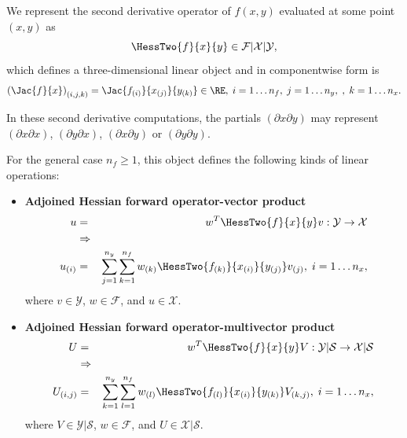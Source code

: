 \documentclass[pdf,ps2pdf,11pt]{SANDreport}
\begin{document}
We represent the second derivative operator of $f(x,y)$ evaluated at
some point $(x,y)$ as
%
\begin{equation}
\HessTwo{f}{x}{y}\in\mathcal{F}|\mathcal{X}|\mathcal{Y},
\end{equation}
%
which defines a three-dimensional linear object and in componentwise form is
%
\begin{equation}
\left(\Jac{f}{x}\right)_{(i,j,k)} = \Jac{f_{(i)}}{x_{(j)}}{y_{(k)}} \in\RE,
  \; i = 1 \ldots n_f, \; j = 1 \ldots n_y, \; , \; k = 1 \ldots n_x.
\end{equation}

In these second derivative computations, the partials $(\partial x {}\partial
y)$ may represent $(\partial x {}\partial x)$, $(\partial y {}\partial x)$,
$(\partial x {}\partial y)$ or $(\partial y {}\partial y)$.

For the general case $n_f\ge{}1$, this object defines the following
kinds of linear operations:
%
\begin{itemize}
%
{}\item \textbf{Adjoined Hessian forward operator-vector product}
%
\begin{eqnarray*}
u & = & w^T \HessTwo{f}{x}{y} v : \mathcal{Y} \rightarrow \mathcal{X} \\
& \Rightarrow & \\
u_{(i)} & = & \sum_{j=1}^{n_y} \sum_{k=1}^{n_f} w_{(k)}\HessTwo{f_{(k)}}{x_{(i)}}{y_{(j)}} v_{(j)},
   \; i = 1 \ldots n_x,
\end{eqnarray*}
%
where $v\in\mathcal{Y}$, $w\in\mathcal{F}$, and $u\in\mathcal{X}$.
%
{}\item \textbf{Adjoined Hessian forward operator-multivector product}
%
\begin{eqnarray*}
U & = & w^T \HessTwo{f}{x}{y} V : \mathcal{Y}|\mathcal{S} \rightarrow \mathcal{X}|\mathcal{S} \\
& \Rightarrow & \\
U_{(i,j)} & = & \sum_{k=1}^{n_y} \sum_{l=1}^{n_f} w_{(l)}\HessTwo{f_{(l)}}{x_{(i)}}{y_{(k)}} V_{(k,j)},
   \; i = 1 \ldots n_x,
\end{eqnarray*}
%
where $V\in\mathcal{Y}|\mathcal{S}$, $w\in\mathcal{F}$, and $U\in\mathcal{X}|\mathcal{S}$.
%
\end{itemize}
\end{document}
